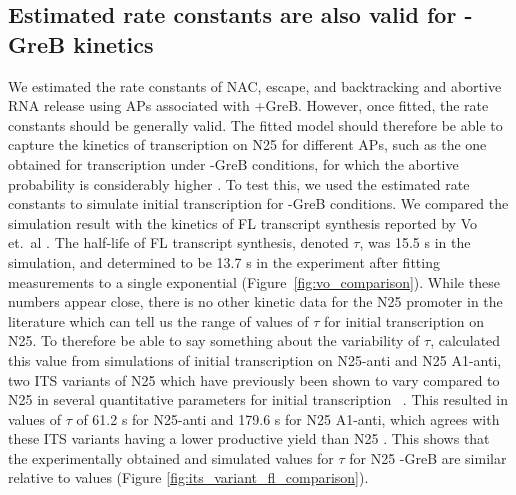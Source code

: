 \subsection{Estimated rate constants are also valid for -GreB kinetics}
We estimated the rate constants of NAC, escape, and backtracking and abortive
RNA release using APs associated with +GreB. However, once fitted, the rate
constants should be generally valid. The fitted model should therefore be able
to capture the kinetics of transcription on N25 for different APs, such as the
one obtained for transcription under -GreB conditions, for which the abortive
probability is considerably higher \cite{hsu_initial_2006}. To test this, we
used the estimated rate constants to simulate initial transcription for -GreB
conditions. We compared the simulation result with the kinetics of FL
transcript synthesis reported by Vo et.\ al \cite{vo_vitro_2003-1}. The
half-life of FL transcript synthesis, denoted $\tau$, was 15.5 s in the
simulation, and determined to be 13.7 s in the experiment after fitting
measurements to a single exponential (Figure~\ref{fig:vo_comparison}). While these
numbers appear close, there is no other kinetic data for the N25 promoter in
the literature which can tell us the range of values of $\tau$ for initial
transcription on N25. To therefore be able to say something about the
variability of $\tau$, calculated this value from simulations of initial
transcription on N25-anti and N25 A1-anti, two ITS variants of N25 which have
previously been shown to vary compared to N25 in several quantitative
parameters for initial transcription~
\cite{hsu_initial_2006,chan_anti-initial_2001,kammerer_functional_1986}. This
resulted in values of $\tau$ of 61.2 s for N25-anti and 179.6 s for N25
A1-anti, which agrees with these ITS variants having a lower productive yield
than N25 \cite{hsu_initial_2006}. This shows that the experimentally obtained
and simulated values for $\tau$ for N25 -GreB are similar relative to values
(Figure \ref{fig:its_variant_fl_comparison}).

